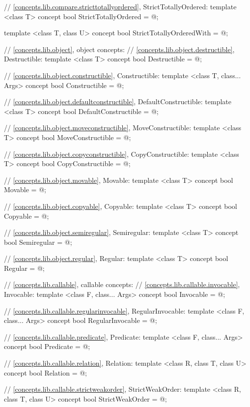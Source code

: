 \begin{codeblock}
{{{{  // \ref{concepts.lib.compare.stricttotallyordered}, StrictTotallyOrdered:
  template <class T>
  concept bool StrictTotallyOrdered = @\seebelow@;

  template <class T, class U>
  concept bool StrictTotallyOrderedWith = @\seebelow@;

  // \ref{concepts.lib.object}, object concepts:
  // \ref{concepts.lib.object.destructible}, Destructible:
  template <class T>
  concept bool Destructible = @\seebelow@;

  // \ref{concepts.lib.object.constructible}, Constructible:
  template <class T, class... Args>
  concept bool Constructible = @\seebelow@;

  // \ref{concepts.lib.object.defaultconstructible}, DefaultConstructible:
  template <class T>
  concept bool DefaultConstructible = @\seebelow@;

  // \ref{concepts.lib.object.moveconstructible}, MoveConstructible:
  template <class T>
  concept bool MoveConstructible = @\seebelow@;

  // \ref{concepts.lib.object.copyconstructible}, CopyConstructible:
  template <class T>
  concept bool CopyConstructible = @\seebelow@;

  // \ref{concepts.lib.object.movable}, Movable:
  template <class T>
  concept bool Movable = @\seebelow@;

  // \ref{concepts.lib.object.copyable}, Copyable:
  template <class T>
  concept bool Copyable = @\seebelow@;

  // \ref{concepts.lib.object.semiregular}, Semiregular:
  template <class T>
  concept bool Semiregular = @\seebelow@;

  // \ref{concepts.lib.object.regular}, Regular:
  template <class T>
  concept bool Regular = @\seebelow@;

  // \ref{concepts.lib.callable}, callable concepts:
  // \ref{concepts.lib.callable.invocable}, Invocable:
  template <class F, class... Args>
  concept bool Invocable = @\seebelow@;

  // \ref{concepts.lib.callable.regularinvocable}, RegularInvocable:
  template <class F, class... Args>
  concept bool RegularInvocable = @\seebelow@;

  // \ref{concepts.lib.callable.predicate}, Predicate:
  template <class F, class... Args>
  concept bool Predicate = @\seebelow@;

  // \ref{concepts.lib.callable.relation}, Relation:
  template <class R, class T, class U>
  concept bool Relation = @\seebelow@;

  // \ref{concepts.lib.callable.strictweakorder}, StrictWeakOrder:
  template <class R, class T, class U>
  concept bool StrictWeakOrder = @\seebelow@;
}}}}
\end{codeblock}


